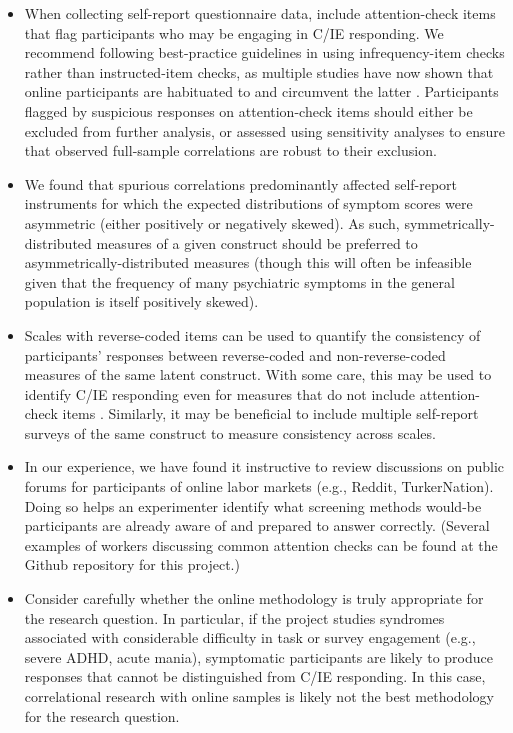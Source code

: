 \documentclass[a4paper,notitlepage,12pt]{article}
\begin{document}
\begin{refsection}[main]
\begin{itemize}
    \item When collecting self-report questionnaire data, include attention-check items that flag participants who may be engaging in C/IE responding. We recommend following best-practice guidelines in using infrequency-item checks rather than instructed-item checks, as multiple studies have now shown that online participants are habituated to and circumvent the latter \cite{barends2019noncompliant, thomas2017validity, hauser2016attentive}. Participants flagged by suspicious responses on attention-check items should either be excluded from further analysis, or assessed using sensitivity analyses to ensure that observed full-sample correlations are robust to their exclusion.

    \item We found that spurious correlations predominantly affected self-report instruments for which the expected distributions of symptom scores were asymmetric (either positively or negatively skewed). As such, symmetrically-distributed measures of a given construct should be preferred to asymmetrically-distributed measures (though this will often be infeasible given that the frequency of many psychiatric symptoms in the general population is itself positively skewed).
    
    \item Scales with reverse-coded items can be used to quantify the consistency of participants' responses between reverse-coded and non-reverse-coded measures of the same latent construct. With some care, this may be used to identify C/IE responding even for measures that do not include attention-check items \cite{emons2009detection}. Similarly, it may be beneficial to include multiple self-report surveys of the same construct to measure consistency across scales.
    
    \item In our experience, we have found it instructive to review discussions on public forums for participants of online labor markets (e.g., Reddit, TurkerNation). Doing so helps an experimenter identify what screening methods would-be participants are already aware of and prepared to answer correctly. (Several examples of workers discussing common attention checks can be found at the Github repository for this project.)
    
    \item Consider carefully whether the online methodology is truly appropriate for the research question. In particular, if the project studies syndromes associated with considerable difficulty in task or survey engagement (e.g., severe ADHD, acute mania), symptomatic participants are likely to produce responses that cannot be distinguished from C/IE responding. In this case, correlational research with online samples is likely not the best methodology for the research question.


\end{itemize}
\end{refsection}
\end{document}
